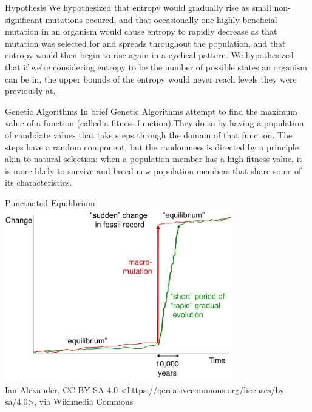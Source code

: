 \documentclass[handout,10pt,aspectratio=169]{beamer}
\begin{document}
\begin{frame}{Hypothesis}
	We hypothesized that entropy would gradually rise as small non-significant
	mutations occured, and that occasionally one highly beneficial mutation in
	an organism would cause entropy to rapidly decrease as that mutation was
	selected for and spreads throughout the population, and that entropy would then
	begin to rise again in a cyclical pattern. We hypothesized that if we're considering
	entropy to be the number of possible states an organism can be in, the
	upper bounds of the entropy would never reach levels they were previously at.
\end{frame}

\begin{frame}{Genetic Algorithms}
	In brief Genetic Algorithms attempt to find the maximum value
        of a function (called a fitness function).They do so by having
        a population of candidate values that take steps through the
        domain of that function.  The steps have a random component,
        but the randomness is directed by a principle akin to natural
        selection: when a population member has a high fitness value,
        it is more likely to survive and breed new population members
        that share some of its characteristics.
	\begin{center}
	\end{center}
\end{frame}

\begin{frame}{Punctuated Equilibrium}
      	\centering
        \includegraphics[width=0.75\textwidth]{Punctuated_Equilibrium.pdf}\\ \tiny
        Ian Alexander, CC BY-SA 4.0
        <https://qcreativecommons.org/licenses/by-sa/4.0>, via
        Wikimedia Commons
\end{frame}
\end{document}
